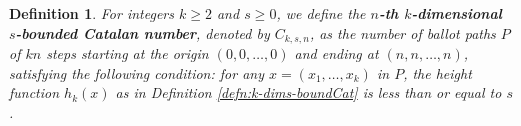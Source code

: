 \documentclass[12pt,notitlepage]{amsart}
\numberwithin{equation}{section}
\theoremstyle{thmstyleone}%
\theoremstyle{thmstyletwo}%
\theoremstyle{thmstylethree}%
\newtheorem{definition}[theorem]{Definition}%
\numberwithin{theorem}{section}
\numberwithin{equation}{section}
\begin{document}

\begin{definition}
    \label{def:bounded-and-height}
    For integers $k \geq 2$ and $s \geq 0$, we define the \textbf{$n$-th $k$-dimensional $s$-bounded Catalan number}, denoted by $C_{k,s,n}$, as the number of ballot paths $P$ of $kn$ steps starting at the origin $(0,0,\ldots, 0)$ and ending at $(n,n,\ldots, n)$, satisfying the following condition: for any $x = (x_1, \dots, x_k)$ in $P$, the height function $h_k(x)$ as in Definition \ref{defn:k-dims-boundCat} is less than or equal to $s$.
\end{definition}
\end{document}
